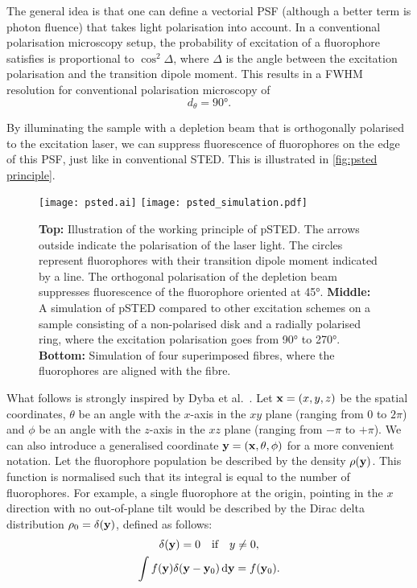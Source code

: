 The general idea is that one can define a vectorial PSF (although a better term is photon fluence) that takes light polarisation into account. In a conventional polarisation microscopy setup, the probability of excitation of a fluorophore satisfies is proportional to $ \cos^2 \Delta $, where $ \Delta $ is the angle between the excitation polarisation and the transition dipole moment. This results in a FWHM resolution for conventional polarisation microscopy of 
\begin{equation}
	d_\theta = \ang{90}.
\end{equation}

By illuminating the sample with a depletion beam that is orthogonally polarised to the excitation laser, we can suppress fluorescence of fluorophores on the edge of this PSF, just like in conventional STED. This is illustrated in \autoref{fig:psted principle}.

\begin{figure}
	\centering
	\texttt{[image: psted.ai]}
	\texttt{[image: psted\_simulation.pdf]}
	\caption{
		\textbf{Top:} Illustration of the working principle of pSTED. The arrows outside indicate the polarisation of the laser light. The circles represent fluorophores with their transition dipole moment indicated by a line. The orthogonal polarisation of the depletion beam suppresses fluorescence of the fluorophore oriented at \ang{45}.
		\textbf{Middle:} A simulation of pSTED compared to other excitation schemes on a sample consisting of a non-polarised disk and a radially polarised ring, where the excitation polarisation goes from \ang{90} to \ang{270}.
		\textbf{Bottom:} Simulation of four superimposed fibres, where the fluorophores are aligned with the fibre. 
	}
	\label{fig:psted principle}
\end{figure}

What follows is strongly inspired by Dyba et al.~\cite{Dyba2005}. Let $ \vb{x} = (x, y, z)$ be the spatial coordinates, $ \theta $ be an angle with the $ x $-axis in the $ xy $ plane (ranging from $ 0 $ to $ 2\pi$) and $ \phi $ be an angle with the $ z $-axis in the $ xz $ plane (ranging from $ -\pi $ to $+\pi$). We can also introduce a generalised coordinate $ \vb{y} = (\vb{x}, \theta, \phi) $ for a more convenient notation.
Let the fluorophore population be described by the density $ \rho(\vb{y}) $. This function is normalised such that its integral is equal to the number of fluorophores. For example, a single fluorophore at the origin, pointing in the $ x $ direction with no out-of-plane tilt would be described by the Dirac delta distribution $ \rho_0 = \delta(\vb{y}) $, defined as follows:
\begin{gather}
	\delta(\vb{y}) = 0 \qq{if} y\neq0, \\
	\int f(\vb{y})\delta(\vb{y}-\vb{y}_0) \dd{\vb{y}} = f(\vb{y}_0).
\end{gather}

